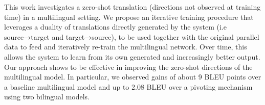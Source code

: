 This work investigates a zero-shot translation (directions not observed at training time) in a multilingual setting. We propose an iterative training procedure that leverages a duality of translations directly generated by the system (i.e source→target and target→source), to be used together with the original parallel data to feed and iteratively re-train the multilingual network. Over time, this allows the system to learn from its own generated and increasingly better output. Our approach shows to be effective in improving the zero-shot directions of the multilingual model. In particular, we observed gains of about 9 BLEU points over a baseline multilingual model and up to 2.08 BLEU over a pivoting mechanism using two bilingual models.
